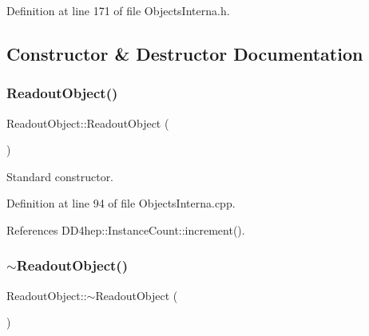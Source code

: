 Definition at line 171 of file Objects\+Interna.\+h.



\subsection{Constructor \& Destructor Documentation}
\hypertarget{class_d_d4hep_1_1_geometry_1_1_readout_object_a996d7d31d97422f508786b6ba827fb84}{}\label{class_d_d4hep_1_1_geometry_1_1_readout_object_a996d7d31d97422f508786b6ba827fb84} 
\subsubsection{\texorpdfstring{Readout\+Object()}{ReadoutObject()}}
{\footnotesize\ttfamily Readout\+Object\+::\+Readout\+Object (\begin{DoxyParamCaption}{ }\end{DoxyParamCaption})}



Standard constructor. 



Definition at line 94 of file Objects\+Interna.\+cpp.



References D\+D4hep\+::\+Instance\+Count\+::increment().

\hypertarget{class_d_d4hep_1_1_geometry_1_1_readout_object_a5a3ba52dd04797f7b3125688d0496507}{}\label{class_d_d4hep_1_1_geometry_1_1_readout_object_a5a3ba52dd04797f7b3125688d0496507} 
\subsubsection{\texorpdfstring{$\sim$\+Readout\+Object()}{~ReadoutObject()}}
{\footnotesize\ttfamily Readout\+Object\+::$\sim$\+Readout\+Object (\begin{DoxyParamCaption}{ }\end{DoxyParamCaption})\hspace{0.3cm}{\ttfamily [virtual]}}



